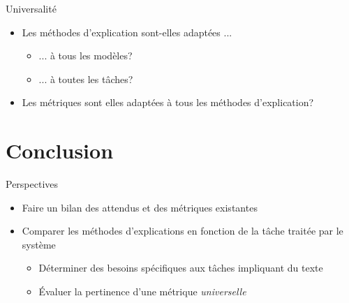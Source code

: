 \documentclass[french, 12pt, aspectratio=2013]{beamer}
\newcommand{\com}[1]{\textcolor{olive}{#1}}
\begin{document}
        \begin{frame}{Universalité}
            \begin{itemize}
                \item Les méthodes d'explication sont-elles adaptées ...
                \begin{itemize}
                    \item ... à tous les modèles?
                    \item ... à toutes les tâches?
                \end{itemize}
                \item Les métriques sont elles adaptées à tous les méthodes d'explication?
            \end{itemize}
        \end{frame}

\section{Conclusion}


\begin{frame}{Perspectives}
    \begin{itemize}
        \item Faire un bilan des attendus et des métriques existantes
        \item Comparer les méthodes d'explications en fonction de la tâche traitée par le système
        \begin{itemize}
            \item Déterminer des besoins spécifiques aux tâches impliquant du texte
            \item Évaluer la pertinence d'une métrique \emph{universelle}
        \end{itemize}
    \end{itemize}
\end{frame}
\end{document}
